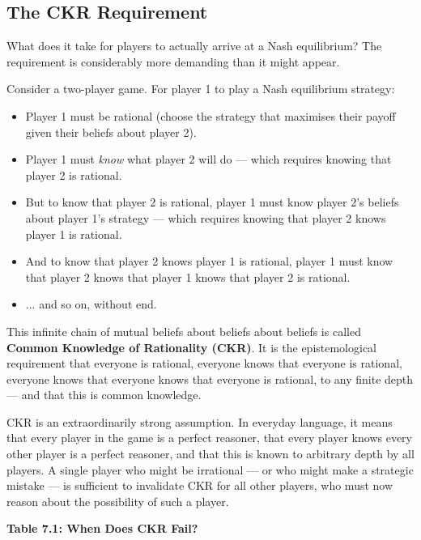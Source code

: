\documentclass[12pt, letterpaper]{article}
\begin{document}
\subsection{The CKR Requirement}


What does it take for players to actually arrive at a Nash equilibrium? The requirement is considerably more demanding than it might appear.

Consider a two-player game. For player 1 to play a Nash equilibrium strategy:
\begin{itemize}
\item Player 1 must be rational (choose the strategy that maximises their payoff given their beliefs about player 2).
\item Player 1 must \textit{know} what player 2 will do --- which requires knowing that player 2 is rational.
\item But to know that player 2 is rational, player 1 must know player 2's beliefs about player 1's strategy --- which requires knowing that player 2 knows player 1 is rational.
\item And to know that player 2 knows player 1 is rational, player 1 must know that player 2 knows that player 1 knows that player 2 is rational.
\item ... and so on, without end.
\end{itemize}

This infinite chain of mutual beliefs about beliefs about beliefs is called \textbf{Common Knowledge of Rationality (CKR)}. It is the epistemological requirement that everyone is rational, everyone knows that everyone is rational, everyone knows that everyone knows that everyone is rational, to any finite depth --- and that this is common knowledge.

CKR is an extraordinarily strong assumption. In everyday language, it means that every player in the game is a perfect reasoner, that every player knows every other player is a perfect reasoner, and that this is known to arbitrary depth by all players. A single player who might be irrational --- or who might make a strategic mistake --- is sufficient to invalidate CKR for all other players, who must now reason about the possibility of such a player.
\newpage

\textbf{Table 7.1: When Does CKR Fail?}
\end{document}
